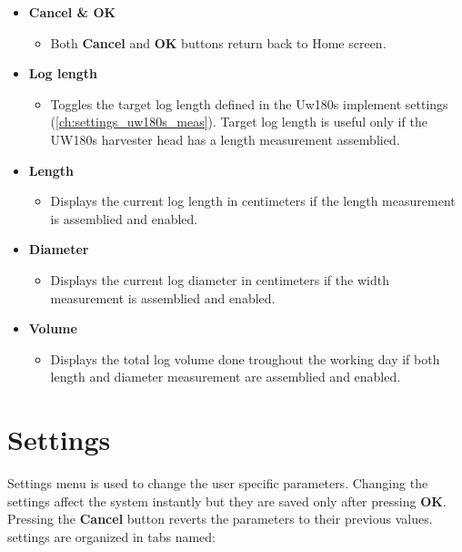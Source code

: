 \documentclass[12pt,a4paper,english]{uvmanual}
\begin{document}
\begin{itemize}
 \item \textbf{Cancel \& OK}
 \begin{itemize}
  \item Both \textbf{Cancel} and \textbf{OK} buttons return back to Home screen.
 \end{itemize}

 \item \textbf{Log length}
 \begin{itemize}
  \item Toggles the target log length defined in the Uw180s implement settings (\autoref{ch:settings_uw180s_meas}). Target log length is useful only if the UW180s harvester head has a length measurement assemblied.
 \end{itemize}

 \item \textbf{Length}
 \begin{itemize}
  \item Displays the current log length in centimeters if the length measurement is assemblied and enabled.
 \end{itemize}

 \item \textbf{Diameter}
 \begin{itemize}
  \item Displays the current log diameter in centimeters if the width measurement is assemblied and enabled.
 \end{itemize}

 \item \textbf{Volume}
 \begin{itemize}
  \item Displays the total log volume done troughout the working day if both length and diameter measurement are assemblied and enabled.
 \end{itemize}

\end{itemize}


\chapter{Settings}\label{ch:settings}

Settings menu is used to change the user specific parameters. Changing the settings affect the system instantly but they are saved only after pressing \textbf{OK}. Pressing the \textbf{Cancel} button reverts the parameters to their previous values. settings are organized in tabs named:
\end{document}
